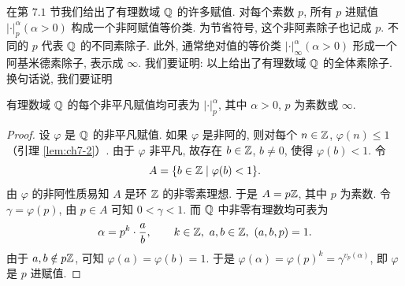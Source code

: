 在第 $7.1$ 节我们给出了有理数域 $\mathbb{Q}$ 的许多赋值. 对每个素数 $p$, 所有 $p$ 进赋值 $|\cdot|_p^{\alpha}(\alpha>0)$ 构成一个非阿赋值等价类. 为节省符号, 这个非阿素除子也记成 $p$. 不同的 $p$ 代表 $\mathbb{Q}$ 的不同素除子. 此外, 通常绝对值的等价类 $|\cdot|_{\infty}^{\alpha}(\alpha>0)$ 形成一个阿基米德素除子, 表示成 $\infty$. 我们要证明: 以上给出了有理数域 $\mathbb{Q}$ 的全体素除子. 换句话说, 我们要证明

\begin{theorem}\label{thm:7.2}
有理数域 $\mathbb{Q}$ 的每个非平凡赋值均可表为 $|\cdot|_p^{\alpha}$, 其中 $\alpha>0$, $p$ 为素数或 $\infty$.
\end{theorem}

\begin{proof}
设 $\varphi$ 是 $\mathbb{Q}$ 的非平凡赋值. 如果 $\varphi$ 是非阿的, 则对每个 $n\in\mathbb{Z}$, $\varphi(n)\leqslant 1$（引理 \ref{lem:ch7-2}）. 由于 $\varphi$ 非平凡, 故存在 $b\in\mathbb{Z}$, $b\neq 0$, 使得 $\varphi(b)<1$. 令
\[
  A=\{b\in\mathbb{Z}\mid\varphi(b)<1\}.
\]
由 $\varphi$ 的非阿性质易知 $A$ 是环 $\mathbb{Z}$ 的非零素理想. 于是 $A=p\mathbb{Z}$, 其中 $p$ 为素数. 令 $\gamma=\varphi(p)$, 由 $p\in A$ 可知 $0<\gamma<1$. 而 $\mathbb{Q}$ 中非零有理数均可表为
\[
  \alpha=p^k\cdot\frac{a}{b},\qquad k\in\Z,\ a,b\in\Z,\ (a,b,p)=1.
\]
由于 $a,b\notin p\mathbb{Z}$, 可知 $\varphi(a)=\varphi(b)=1$. 于是 $\varphi(\alpha)=\varphi(p)^k=\gamma^{v_p(\alpha)}$, 即 $\varphi$ 是 $p$ 进赋值.


\end{proof}
